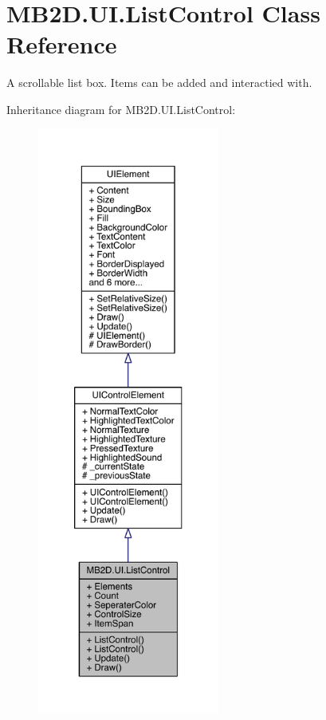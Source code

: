 \hypertarget{class_m_b2_d_1_1_u_i_1_1_list_control}{}\section{M\+B2\+D.\+U\+I.\+List\+Control Class Reference}
\label{class_m_b2_d_1_1_u_i_1_1_list_control}


A scrollable list box. Items can be added and interactied with.  




Inheritance diagram for M\+B2\+D.\+U\+I.\+List\+Control\+:
\nopagebreak
\begin{figure}[H]
\begin{center}
\leavevmode
\includegraphics[height=550pt]{class_m_b2_d_1_1_u_i_1_1_list_control__inherit__graph}
\end{center}
\end{figure}


